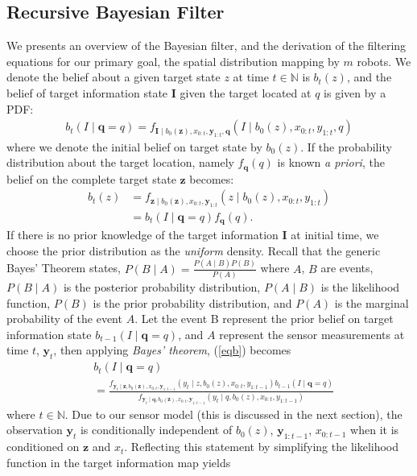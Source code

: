 \documentclass[journal]{IEEEtran}
\begin{document}
\subsection{Recursive Bayesian Filter}
We presents an overview of the Bayesian filter, and the derivation of the filtering equations for our primary goal, the spatial distribution mapping by $m$ robots. We denote the belief about a given target state $z$ at time $t \in \mathbb{N}$ is $b_t(z)$, and the belief of target information state $\bm{I}$ given the target located at $q$ is given by a PDF:
\begin{align}
b_t(I \mid \bm{q} = q)= f_{\bm{I}\mid b_0(\bm{z}),{x}_{0:t},\bm{y}_{1:t},\bm{q}}
\left(
I \mid b_0(z),
{x}_{0:t},y_{1:t},q
\right)
\label{eqb}
\end{align}
where we denote the initial belief on target state by $b_0(z)$.
If the probability distribution about the target location, namely $f_{\bm{q}}(q)$ is known \emph{a priori}, the belief on the complete target state $\bm{z}$ becomes:
\begin{align}
b_t(z)&=
f_{\bm{z} \mid b_0(\bm{z}),{x}_{0:t},\bm{y}_{1:t}}
\left(
z \mid b_0(z),
{x}_{0:t},y_{1:t}
\right) \nonumber  \\
&=
b_t(I\mid \bm{q}=q)f_{\bm{q}}(q). 
\label{eq0}
\end{align}
If there is no prior knowledge of the target information $\bm{I}$ at initial time, we
choose the prior distribution as the \emph{uniform} density. Recall that the generic Bayes' Theorem states,
$
P(B\mid A) = \frac{P(A \mid B)P(B)}{P(A)}
$
where $A$, $B$ are events, $P(B\mid A)$ is the posterior probability distribution, $P(A \mid B)$ is the likelihood function, $P(B)$ is the prior probability distribution, and $P(A)$ is the marginal probability of the event $A$. Let the event B represent the prior belief on target information state $b_{t-1}(I\mid \bm{q}=q)$, and $A$ represent the sensor measurements at time $t$, $\bm{y}_t$, then applying \emph{Bayes' theorem}, (\ref{eqb}) becomes
{\small{
\begin{align*}
&b_{t}(I \mid \bm{q} =q)\\
&=
\frac{
	f_{\bm{y}_{t} \mid
\bm{z},b_0(\bm{z}),
{x}_{0:t},\bm{y}_{1:t-1}	
}\left(
	y_{t} \mid
	z,b_0(z),
	{x}_{0:t},y_{1:t-1}
\right)
b_{t-1}(I\mid \bm{q} = q)
}
{
f_{\bm{y}_{t} \mid
		\bm{q},
		b_0(\bm{z}),
		{x}_{0:t},\bm{y}_{1:t-1}	
	}\left(
	y_{t} \mid
	q,b_0(z),
	{x}_{0:t},y_{1:t-1}
	\right)
}
\end{align*}}}where $t \in \mathbb{N}$.
Due to our sensor model (this is discussed in the next section), the observation $\bm{y}_{t}$ is conditionally independent of $b_0(z)$, $\bm{y}_{1:t-1}$, $x_{0:t-1}$ when it is  conditioned on $\bm{z}$ and $x_t$. Reflecting this statement by simplifying the likelihood function in the target information map yields
\end{document}
